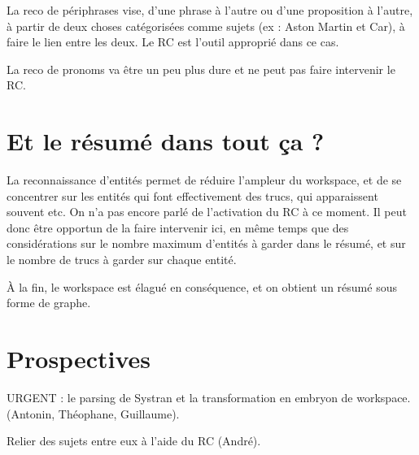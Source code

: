 \documentclass[a4paper,12pt]{article}
\begin{document}
La reco de périphrases vise, d'une phrase à l'autre ou d'une proposition à l'autre, à partir de deux choses catégorisées comme sujets (ex : Aston Martin et Car), à faire le lien entre les deux. Le RC est l'outil approprié dans ce cas.

La reco de pronoms va être un peu plus dure et ne peut pas faire intervenir le RC.

\section{Et le résumé dans tout ça ?}

La reconnaissance d'entités permet de réduire l'ampleur du workspace, et de se concentrer sur les entités qui font effectivement des trucs, qui apparaissent souvent etc. On n'a pas encore parlé de l'activation du RC à ce moment. Il peut donc être opportun de la faire intervenir ici, en même temps que des considérations sur le nombre maximum d'entités à garder dans le résumé, et sur le nombre de trucs à garder sur chaque entité.

À la fin, le workspace est élagué en conséquence, et on obtient un résumé sous forme de graphe.

 
\section{Prospectives}
URGENT : le parsing de Systran et la transformation en embryon de workspace.
(Antonin, Théophane, Guillaume).

Relier des sujets entre eux à l'aide du RC (André).


 
\end{document}
